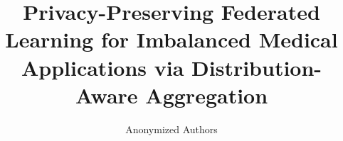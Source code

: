 \documentclass[runningheads]{llncs}
\begin{document}
%
\title{Privacy-Preserving Federated Learning for Imbalanced Medical Applications via Distribution-Aware Aggregation}
%

\author{Anonymized Authors}  %
  
\end{document}
